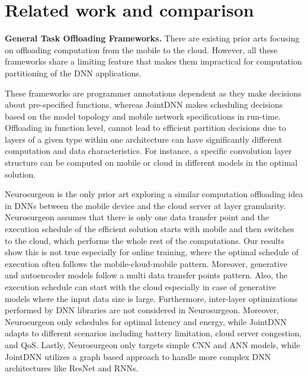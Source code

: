 \section{Related work and comparison}

\textbf{General Task Offloading Frameworks.} There are existing prior arts focusing on offloading computation from the mobile to the cloud\cite{Oedessa, Comet, CloneCloud, MAUI, ExecutionJavaScript, Refactoring}. However, all these frameworks share a limiting feature that makes them impractical for computation partitioning of the DNN applications. 


These frameworks are programmer annotations dependent as they make decisions about pre-specified functions, whereas JointDNN makes scheduling decisions based on the model topology and mobile network specifications in run-time. Offloading in function level, cannot lead to efficient partition decisions due to layers of a given type within one architecture can have significantly different computation and data characteristics. For instance, a specific convolution layer structure can be computed on mobile or cloud in different models in the optimal solution. 

Neurosurgeon is the only prior art exploring a similar computation offloading idea in DNNs between the mobile device and the cloud server at layer granularity. Neurosurgeon assumes that there is only one data transfer point and the execution schedule of the efficient solution starts with mobile and then switches to the cloud, which performs the whole rest of the computations. Our results show this is not true especially for online training, where the optimal schedule of execution often follows the mobile-cloud-mobile pattern. Moreover, generative and autoencoder models follow a multi data transfer points pattern. Also, the execution schedule can start with the cloud especially in case of generative models where the input data size is large. Furthermore, inter-layer optimizations performed by DNN libraries are not considered in Neurosurgeon. Moreover, Neurosurgeon only schedules for optimal latency and energy, while JointDNN adapts to different scenarios including battery limitation, cloud server congestion, and QoS. Lastly, Neurosurgeon only targets simple CNN and ANN models, while JointDNN utilizes a graph based approach to handle more complex DNN architectures like ResNet and RNNs.